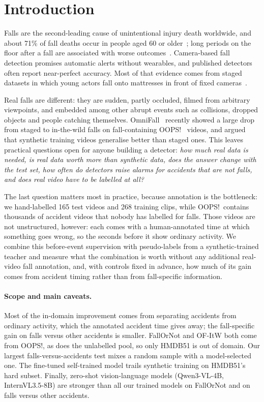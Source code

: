 \documentclass[10pt,twocolumn,letterpaper]{article}
\begin{document}
\section{Introduction}
Falls are the second-leading cause of unintentional injury death worldwide, and about 71\% of fall deaths occur in people aged 60 or older~\cite{who_falls}; long periods on the floor after a fall are associated with worse outcomes~\cite{fleming2008}. Camera-based fall detection promises automatic alerts without wearables, and published detectors often report near-perfect accuracy. Most of that evidence comes from staged datasets in which young actors fall onto mattresses in front of fixed cameras~\cite{kwolek2014,charfi2013}.

Real falls are different: they are sudden, partly occluded, filmed from arbitrary viewpoints, and embedded among other abrupt events such as collisions, dropped objects and people catching themselves. OmniFall~\cite{omnifall} recently showed a large drop from staged to in-the-wild falls on fall-containing OOPS!~\cite{epstein2020oops} videos, and argued that synthetic training videos generalise better than staged ones. This leaves practical questions open for anyone building a detector: \emph{how much real data is needed, is real data worth more than synthetic data, does the answer change with the test set, how often do detectors raise alarms for accidents that are not falls, and does real video have to be labelled at all?}

The last question matters most in practice, because annotation is the bottleneck: we hand-labelled 165 test videos and 268 training clips, while OOPS!\ contains thousands of accident videos that nobody has labelled for falls. Those videos are not unstructured, however: each comes with a human-annotated time at which something goes wrong, so the seconds before it show ordinary activity. We combine this before-event supervision with pseudo-labels from a synthetic-trained teacher and measure what the combination is worth without any additional real-video fall annotation, and, with controls fixed in advance, how much of its gain comes from accident timing rather than from fall-specific information.

\paragraph{Scope and main caveats.} Most of the in-domain improvement comes from separating accidents from ordinary activity, which the annotated accident time gives away; the fall-specific gain on falls versus other accidents is smaller. FallOrNot and OF-ItW both come from OOPS!, as does the unlabelled pool, so only HMDB51 is out of domain. Our largest falls-versus-accidents test mixes a random sample with a model-selected one. The fine-tuned self-trained model trails synthetic training on HMDB51's hard subset. Finally, zero-shot vision-language models (Qwen3-VL-4B, InternVL3.5-8B) are stronger than all our trained models on FallOrNot and on falls versus other accidents.
\end{document}
